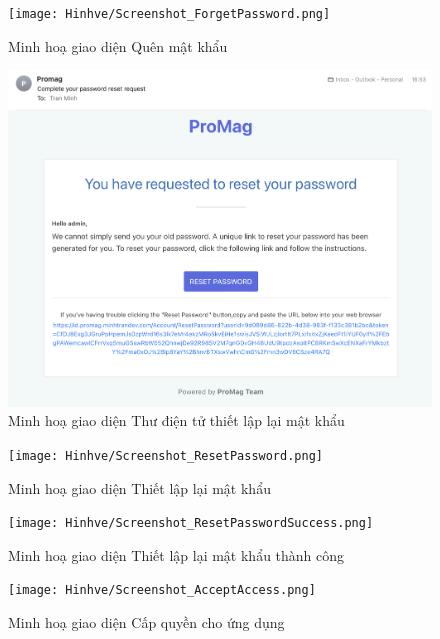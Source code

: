 \documentclass[../DoAn.tex]{subfiles}
\begin{document}
\begin{figure}[H]
    \centering
    \texttt{[image: Hinhve/Screenshot\_ForgetPassword.png]}
    \caption{Minh hoạ giao diện Quên mật khẩu}
    \label{fig:Screenshot_ForgetPassword}
\end{figure}

\newpage

\begin{figure}[H]
    \centering
    \includegraphics[width=1.0\linewidth]{Hinhve/Screenshot_ResetPasswordEmail.png}
    \caption{Minh hoạ giao diện Thư điện tử thiết lập lại mật khẩu}
    \label{fig:Screenshot_ResetPasswordEmail}
\end{figure}

\newpage

\begin{figure}[H]
    \centering
    \texttt{[image: Hinhve/Screenshot\_ResetPassword.png]}
    \caption{Minh hoạ giao diện Thiết lập lại mật khẩu}
    \label{fig:Screenshot_ResetPassword}
\end{figure}

\begin{figure}[H]
    \centering
    \texttt{[image: Hinhve/Screenshot\_ResetPasswordSuccess.png]}
    \caption{Minh hoạ giao diện Thiết lập lại mật khẩu thành công}
    \label{fig:Screenshot_ResetPasswordSuccess}
\end{figure}

\newpage

\begin{figure}[H]
    \centering
    \texttt{[image: Hinhve/Screenshot\_AcceptAccess.png]}
    \caption{Minh hoạ giao diện Cấp quyền cho ứng dụng}
    \label{fig:Screenshot_AcceptAccess}
\end{figure}
\end{document}
